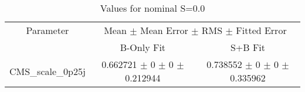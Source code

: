 \begin{table}
\centering
\caption{Values for nominal S=0.0}
\begin{tabular}{ccc}
\toprule
Parameter & \multicolumn{2}{c}{Mean $\pm$ Mean Error $\pm$ RMS $\pm$ Fitted Error}\\
 & B-Only Fit & S+B Fit\\
\midrule
CMS\_scale\_0p25j & \num{0.662721} $\pm$ \num{0} $\pm$ \num{0} $\pm$ \num{0.212944} & \num{0.738552} $\pm$ \num{0} $\pm$ \num{0} $\pm$ \num{0.335962}\\
\bottomrule
\end{tabular}
\end{table}